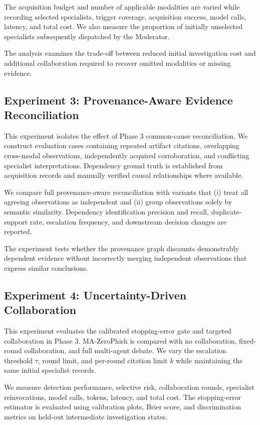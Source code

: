 The acquisition budget and number
of applicable modalities are varied
while recording selected specialists,
trigger coverage, acquisition success,
model calls, latency, and total cost.
We also measure the proportion of
initially unselected specialists
subsequently dispatched by the
Moderator.

The analysis examines the trade-off
between reduced initial investigation
cost and additional collaboration
required to recover omitted
modalities or missing evidence.

\subsection{Experiment 3: Provenance-Aware
Evidence Reconciliation}
\label{sec:exp3}

This experiment isolates the effect
of Phase 3 common-cause reconciliation.
We construct evaluation cases containing
repeated artifact citations, overlapping
cross-modal observations, independently
acquired corroboration, and conflicting
specialist interpretations. Dependency
ground truth is established from
acquisition records and manually
verified causal relationships where
available.

We compare full provenance-aware
reconciliation with variants that
(i) treat all agreeing observations
as independent and (ii) group
observations solely by semantic
similarity. Dependency identification
precision and recall, duplicate-support
rate, escalation frequency, and
downstream decision changes are
reported.

The experiment tests whether the
provenance graph discounts demonstrably
dependent evidence without incorrectly
merging independent observations
that express similar conclusions.

\subsection{Experiment 4: Uncertainty-Driven
Collaboration}
\label{sec:exp4}

This experiment evaluates the calibrated
stopping-error gate and targeted
collaboration in Phase 3. MA-ZeroPhish
is compared with no collaboration,
fixed-round collaboration, and
full multi-agent debate. We vary
the escalation threshold $\tau$,
round limit, and per-round citation
limit $k$ while maintaining the
same initial specialist records.

We measure detection performance,
selective risk, collaboration rounds,
specialist reinvocations, model calls,
tokens, latency, and total cost.
The stopping-error estimator is
evaluated using calibration plots,
Brier score, and discrimination
metrics on held-out intermediate
investigation states.

